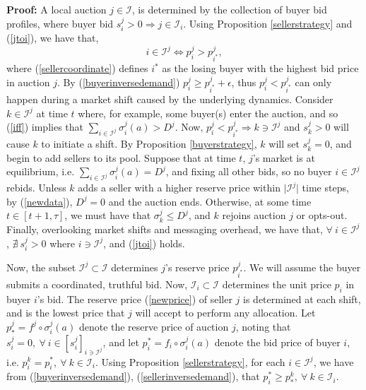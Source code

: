 \documentclass[sigconf, anonymous]{acmart}
\newcommand{\mcI}{\mathcal{I}}
\newcommand{\g}{\sigma}
\theoremstyle{definition}
\begin{document}
\textbf{Proof:}
A local auction $j\in\mcI$, is determined by the collection of buyer bid
profiles, where buyer bid $s_i^j > 0 \Rightarrow j\in\mcI_i$. Using Proposition \ref{sellerstrategy} and (\ref{jtoi}), we have that, 
\begin{equation}\label{iff}
    i\in\mcI^j \Leftrightarrow p_i^j > p_{i^*}^j,
\end{equation}
where
(\ref{sellercoordinate}) defines $i^*$ as the losing buyer with the highest bid
price in auction $j$. By (\ref{buyerinversedemand}) $p_i^j \ge
p_{i^*}^j+\epsilon$, thus $p_i^j < p_{i^*}^j$ can only happen during a market
shift caused by the underlying dynamics.
Consider $k\in\mcI^j$ at time $t$ where, for example, some buyer(s) enter the auction, and
so (\ref{iff}) implies that
$\sum_{i\in\mcI^j} \g_i^j(a) > D^j$. Now, $p_i^j < p_{i^*}^j\Rightarrow k\ni\mcI^j$ and
$s_k^j>0$ will cause $k$ to initiate a shift. By Proposition \ref{buyerstrategy}, $k$ will set $s_k^j=0$, and begin to add sellers to its pool.
Suppose that at time $t$, $j$'s market is at equilibrium, i.e.
$\sum_{i\in\mcI^j} \g_i^j(a) = D^j$, and fixing all other bids, so 
no buyer $i\in\mcI^j$ rebids. Unless $k$ adds a seller with a higher reserve
price within $\vert\mcI^j\vert$ time steps, by (\ref{newdata}), $D^j=0$ and the
auction ends. Otherwise, at some time $t\in[t+1,\tau]$, we must have that
$\g_k^j \le D^j$, and $k$ rejoins auction $j$ or opts-out. Finally, overlooking market shifts and messaging
overhead, we have that,
$\forall \ i\in\mcI^j$, $\nexists \ s_i^j > 0$ where $i \ni \mcI^j$, and (\ref{jtoi})
holds.
\iffalse
Furthermore, we note that $\lambda \subset \mcI$ is a complete and disjoint set
of bid vectors with respect to auction $j$. That is, $\forall \ i \in \mcI^j,
s_i^k > 0 \in \lambda$ if and only if $s_i^k>0 \in\mcI$, and so $s_i \in \lambda
\equiv s_i \in \mcI$. (NEED TO ADD TO LEMMA AND PROVE?)
\fi

Now, the subset $\mcI^j \subset \mcI$
determines $j$'s reserve price $p_{i^*}^j$. We will assume the buyer submits a
coordinated, truthful bid. Now, $\mcI_i\subset \mcI$ 
determines the unit price $p_{i}$ in buyer $i$'s bid.
The reserve price (\ref{newprice}) of seller $j$ is determined at each
shift, and is
the lowest price that $j$ will accept to perform any allocation.
Let $p_*^j = f^j \circ \g_i^j(a) $ denote the reserve
price of auction $j$, noting that $s_i^j=0, \ \forall \ i \in
[s_i^j]_{i\ni\mcI^j}$, and let $p_i^*= f_i \circ \g_i^j(a)$ denote the bid price of buyer $i$, i.e. $p_i^k = p_i^*,
\ \forall \ k \in\mcI_i$. 
Using Proposition
\ref{sellerstrategy}, for each $i \in \mcI^j$, we have from (\ref{buyerinversedemand}), (\ref{sellerinversedemand}), that $p_i^* \ge p_*^k,
\ \forall \ k \in\mcI_i$.
\end{document}
